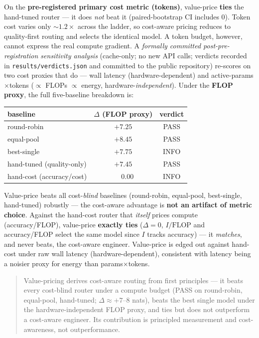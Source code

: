\documentclass[11pt]{article}
\theoremstyle{plain}
\theoremstyle{definition}
\theoremstyle{remark}
\newcommand{\I}{I}
\begin{document}
On the \textbf{pre-registered primary cost metric (tokens)}, value-price \textbf{ties} the hand-tuned router ---
it does \emph{not} beat it (paired-bootstrap CI includes $0$). Token cost varies only $\sim\!1.2\times$ across the
ladder, so cost-aware pricing reduces to quality-first routing and selects the identical model. A token budget,
however, cannot express the real compute gradient. A \emph{formally committed post-pre-registration sensitivity
analysis} (cache-only; no new API calls; verdicts recorded in \texttt{results/verdicts.json} and committed to the
public repository) re-scores on two cost proxies that do --- wall latency (hardware-dependent) and
active-params$\times$tokens ($\propto$ FLOPs $\propto$ energy, hardware-\emph{independent}). Under the
\textbf{FLOP proxy}, the full five-baseline breakdown is:

\begin{center}
\begin{tabular}{lcc}
\toprule
baseline & $\Delta$ (FLOP proxy) & verdict \\
\midrule
round-robin       & $+7.25$\;[$+6.07$, $+8.29$] & PASS \\
equal-pool        & $+8.45$\;[$+7.31$, $+9.62$] & PASS \\
best-single       & $+7.75$\;[$+6.61$, $+8.84$] & INFO \\
hand-tuned (quality-only) & $+7.45$\;[$+6.33$, $+8.48$] & PASS \\
hand-cost (accuracy/cost) & $\phantom{+}0.00$ & INFO \\
\bottomrule
\end{tabular}
\end{center}

\noindent Value-price beats all cost-\emph{blind} baselines (round-robin, equal-pool, best-single, hand-tuned)
robustly --- the cost-aware advantage is \textbf{not an artifact of metric choice}. Against the hand-cost router
that \emph{itself} prices compute (accuracy/FLOP), value-price \textbf{exactly ties} ($\Delta = 0$,
$\I/\text{FLOP}$ and accuracy/FLOP select the same model since $\I$ tracks accuracy) --- it \emph{matches}, and
never beats, the cost-aware engineer. Value-price is edged out against hand-cost under raw wall latency
(hardware-dependent), consistent with latency being a noisier proxy for energy than params$\times$tokens.

\begin{quote}
Value-pricing derives cost-aware routing from first principles --- it beats every cost-blind router under a compute
budget (PASS on round-robin, equal-pool, hand-tuned; $\Delta \approx +7$--$8$ nats), beats the best single model
under the hardware-independent FLOP proxy, and ties but does not outperform a cost-aware engineer. Its
contribution is principled measurement and cost-awareness, not outperformance.
\end{quote}
\end{document}
